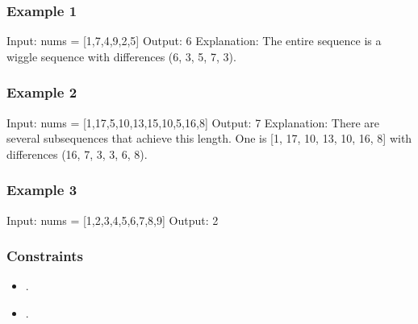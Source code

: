 \documentclass[letterpaper,12pt,english]{book}
\begin{document}
\subsubsection{Example 1}
\label{\detokenize{Mathematics/09_MTH_376_Wiggle_Subsequence:example-1}}
\begin{sphinxVerbatim}[commandchars=\\\{\}]
Input: nums = [1,7,4,9,2,5]
Output: 6
Explanation: The entire sequence is a wiggle sequence with differences (6, \PYGZhy{}3, 5, \PYGZhy{}7, 3).
\end{sphinxVerbatim}


\subsubsection{Example 2}
\label{\detokenize{Mathematics/09_MTH_376_Wiggle_Subsequence:example-2}}
\begin{sphinxVerbatim}[commandchars=\\\{\}]
Input: nums = [1,17,5,10,13,15,10,5,16,8]
Output: 7
Explanation: There are several subsequences that achieve this length.
One is [1, 17, 10, 13, 10, 16, 8] with differences (16, \PYGZhy{}7, 3, \PYGZhy{}3, 6, \PYGZhy{}8).
\end{sphinxVerbatim}


\subsubsection{Example 3}
\label{\detokenize{Mathematics/09_MTH_376_Wiggle_Subsequence:example-3}}
\begin{sphinxVerbatim}[commandchars=\\\{\}]
Input: nums = [1,2,3,4,5,6,7,8,9]
Output: 2
\end{sphinxVerbatim}


\subsubsection{Constraints}
\label{\detokenize{Mathematics/09_MTH_376_Wiggle_Subsequence:constraints}}\begin{itemize}
\item {} 
\sphinxAtStartPar
{}.

\item {} 
\sphinxAtStartPar
{}.

\end{itemize}
\end{document}
